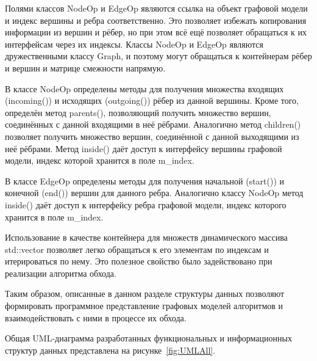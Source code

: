 Полями классов \textsf{NodeOp} и \textsf{EdgeOp} являются ссылка на объект графовой модели и индекс вершины и ребра соответственно. Это позволяет избежать копирования информации из вершин и рёбер, но при этом всё ещё позволяет обращаться к их интерфейсам через их индексы. Классы \textsf{NodeOp} и \textsf{EdgeOp} являются дружественными классу \textsf{Graph}, и поэтому могут обращаться к контейнерам рёбер и вершин и матрице смежности напрямую.

В классе \textsf{NodeOp} определены методы для получения множества входящих (\textsf{incoming()}) и исходящих (\textsf{outgoing()}) рёбер из данной вершины. Кроме того, определён метод \textsf{parents()}, позволяющий получить множество вершин, соединённых с данной входящими в неё рёбрами. Аналогично метод \textsf{children()} позволяет получить множество вершин, соединённой с данной выходящими из неё рёбрами. Метод \textsf{inside()} даёт доступ к интерфейсу вершины графовой модели, индекс которой хранится в поле \textsf{m_index}.

В классе \textsf{EdgeOp} определены методы для получения начальной (\textsf{start()}) и конечной (\textsf{end()}) вершин для данного ребра. Аналогично классу \textsf{NodeOp} метод {inside()} даёт доступ к интерфейсу ребра графовой модели, индекс которого хранится в поле \textsf{m_index}.

Использование в качестве контейнера для множеств динамического массива \textsf{std::vector} позволяет легко обращаться к его элементам по индексам и итерироваться по нему. Это полезное свойство было задействовано при реализации алгоритма обхода.

Таким образом, описанные в данном разделе структуры данных позволяют формировать программное представление графовых моделей алгоритмов и взаимодействовать с ними в процессе их обхода.

Общая UML-диаграмма разработанных функциональных и информационных структур данных представлена на рисунке~\ref{fig:UMLAll}.

